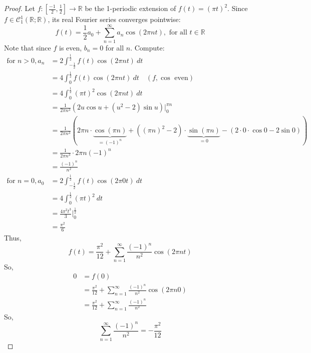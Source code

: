 \documentclass[12pt, reqno]{amsart}
\theoremstyle{definition}
\theoremstyle{remark}
\begin{document}
\begin{itemize}
\begin{proof}
    Let $f:[\frac{-1}{2},\frac{1}{2}]\rightarrow \mathbb{R}$ be the 1-periodic extension of $f(t)=(\pi t)^{2}$. Since $f\in\mathcal{C}^{1}_{1}(\mathbb{R};\mathbb{R})$, its real Fourier series converges pointwise: $$f(t)= \frac{1}{2}a_{0}+\sum_{n=1}^{\infty}a_{n}\cos(2\pi nt),\text{ for all }t\in \mathbb{R}$$Note that since $f$ is even, $b_{n}=0$ for all $n$. Compute: \begin{align*}
        \text{for }n>0, a_{n}&= 2\int_{-\frac{1}{2}}^{\frac{1}{2}}f(t)\cos(2\pi nt)\ dt\\
        &= 4\int_{0}^{\frac{1}{2}}f(t)\cos(2\pi nt)\ dt\quad(f,\cos \text{ even})\\
        &= 4\int_{0}^{\frac{1}{2}}(\pi t)^{2}\cos(2\pi nt)\ dt\\
        &= \frac{1}{2\pi n^{3}}(2u\cos u+(u^{2}-2)\sin u)\bigg|_{0}^{\pi n}\\
        &= \frac{1}{2\pi n^{3}}(2\pi n\cdot \underbrace{\cos(\pi n)}_{=(-1)^{n}}+((\pi n)^{2}-2)\cdot\underbrace{\sin(\pi n)}_{=0}-(2\cdot0\cdot\cos 0-2\sin0))\\
        &= \frac{1}{2\pi n^{3}}\cdot 2\pi n(-1)^{n}\\
        &= \frac{(-1)^{n}}{n^{2}}\\
        \text{for }n=0,a_{0}&= 2\int_{- \frac{1}{2}}^{\frac{1}{2}}f(t)\cos(2\pi 0t)\ dt\\
        &= 4\int_{0}^{\frac{1}{2}}(\pi t)^{2}\ dt\\
        &= \frac{4\pi^{2}t^{3}}{3}\bigg|_{0}^{\frac{1}{2}}\\
        &= \frac{\pi^{2}}{6}
        \end{align*}
        Thus, $$f(t)= \frac{\pi^{2}}{12}+\sum_{n=1}^{\infty} \frac{(-1)^{n}}{n^{2}}\cos(2\pi nt)$$So, \begin{align*}
        0&= f(0)\\
        &= \frac{\pi^{2}}{12}+\sum_{n=1}^{\infty} \frac{(-1)^{n}}{n^{2}}\cos(2\pi n0)\\
        &= \frac{\pi^{2}}{12}+\sum_{n=1}^{\infty} \frac{(-1)^{n}}{n^{2}}
        \end{align*}So, $$\sum_{n=1}^{\infty} \frac{(-1)^{n}}{n^{2}}= - \frac{\pi^{2}}{12}$$
        
\end{proof}

\end{itemize}

\vspace{0.2 cm}
\end{document}
